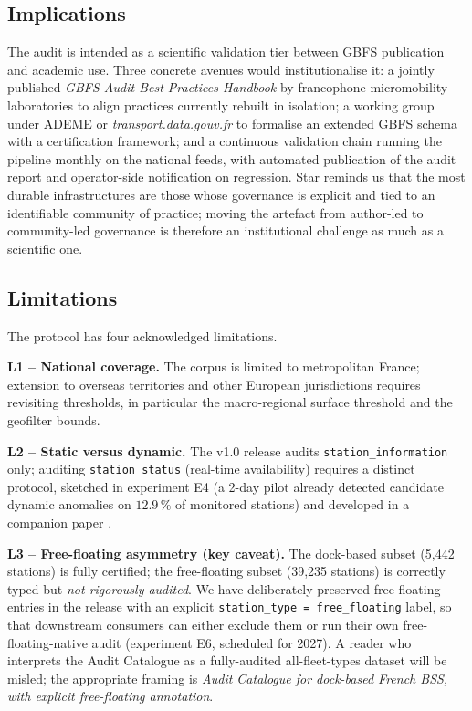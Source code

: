 \documentclass[11pt,a4paper]{article}
\begin{document}
\subsection{Implications}
The audit is intended as a scientific validation tier between GBFS
publication and academic use. Three concrete avenues would
institutionalise it: a jointly published \emph{GBFS Audit Best
Practices Handbook} by francophone micromobility laboratories to
align practices currently rebuilt in isolation; a working group
under ADEME or \emph{transport.data.gouv.fr} to formalise an
extended GBFS schema with a certification framework; and a
continuous validation chain running the pipeline monthly on the
national feeds, with automated publication of the audit report and
operator-side notification on regression. Star \cite{Star2010}
reminds us that the most durable infrastructures are those whose
governance is explicit and tied to an identifiable community of
practice; moving the artefact from author-led to community-led
governance is therefore an institutional challenge as much as a
scientific one.

\subsection{Limitations}\label{secLimitations}
The protocol has four acknowledged limitations.

\textbf{L1 -- National coverage.} The corpus is limited to metropolitan
France; extension to overseas territories and other European
jurisdictions requires revisiting thresholds, in particular the
macro-regional surface threshold and the geofilter bounds.

\textbf{L2 -- Static versus dynamic.} The v1.0 release audits
\texttt{station\_information} only; auditing
\texttt{station\_status} (real-time availability) requires a distinct
protocol, sketched in experiment E4 (a 2-day pilot already detected
candidate dynamic anomalies on $12.9\,\%$ of monitored stations) and
developed in a companion paper \cite{Fosse2026flows}.

\textbf{L3 -- Free-floating asymmetry (key caveat).} The dock-based
subset (5{,}442 stations) is fully certified; the free-floating subset
(39{,}235 stations) is correctly typed but \emph{not rigorously
audited}. We have deliberately preserved free-floating entries in the
release with an explicit \texttt{station\_type = free\_floating} label,
so that downstream consumers can either exclude them or run their own
free-floating-native audit (experiment E6, scheduled for 2027). A
reader who interprets the Audit Catalogue as a fully-audited
all-fleet-types dataset will be misled; the appropriate framing is
\emph{Audit Catalogue for dock-based French BSS, with explicit
free-floating annotation}.
\end{document}
